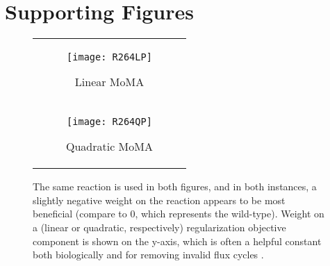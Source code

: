 \section{Supporting Figures}

\begin{figure}[H]
\centering
\begin{tabular}{c}
\begin{subfigure}[b]{\textwidth}
  \texttt{[image: R264LP]}
  \caption{Linear MoMA} 
  \label{fig:R264LP}
\end{subfigure}
\\
\begin{subfigure}[b]{\textwidth}
  \texttt{[image: R264QP]}
  \caption{Quadratic MoMA} 
  \label{fig:R264QP}
\end{subfigure}
\\
\end{tabular}
\caption{The same reaction is used in both figures, and in both
instances, a slightly negative weight on the reaction appears to be
most beneficial (compare to 0, which represents the wild-type).
Weight on a (linear or quadratic, respectively) 
regularization objective component is shown on the y-axis, which is often a helpful
constant both biologically and for removing invalid flux cycles 
\citep{Schuetz2012, Smallbone2009a}.}
\label{fig:wMoMA_smoothness}
\end{figure}
